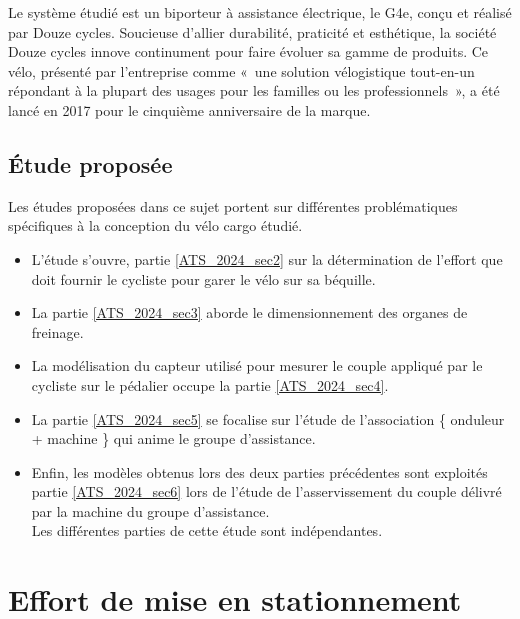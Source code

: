 Le système étudié est un biporteur à assistance électrique, le G4e, conçu et réalisé par Douze cycles. Soucieuse d'allier durabilité, praticité et esthétique, la société Douze cycles innove continument pour faire évoluer sa gamme de produits. Ce vélo, présenté par l'entreprise comme «~une solution vélogistique tout-en-un répondant à la plupart des usages pour les familles ou les professionnels~», a été lancé en 2017 pour le cinquième anniversaire de la marque.
\fi

\subsection{Étude proposée}

\ifprof
\else

Les études proposées dans ce sujet portent sur différentes problématiques spécifiques à la conception du vélo cargo étudié.

\begin{itemize}
  \item L'étude s'ouvre, partie \ref{ATS_2024_sec2} sur la détermination de l'effort que doit fournir le cycliste pour garer le vélo sur sa béquille.
  \item La partie \ref{ATS_2024_sec3} aborde le dimensionnement des organes de freinage.
  \item La modélisation du capteur utilisé pour mesurer le couple appliqué par le cycliste sur le pédalier occupe la partie \ref{ATS_2024_sec4}.
  \item La partie \ref{ATS_2024_sec5} se focalise sur l'étude de l'association \{ onduleur + machine \} qui anime le groupe d'assistance.
  \item Enfin, les modèles obtenus lors des deux parties précédentes sont exploités partie \ref{ATS_2024_sec6} lors de l'étude de l'asservissement du couple délivré par la machine du groupe d'assistance.\\
Les différentes parties de cette étude sont indépendantes.
\end{itemize}

\fi

\section{Effort de mise en stationnement \label{ATS_2024_sec2}}
\ifprof
\else

